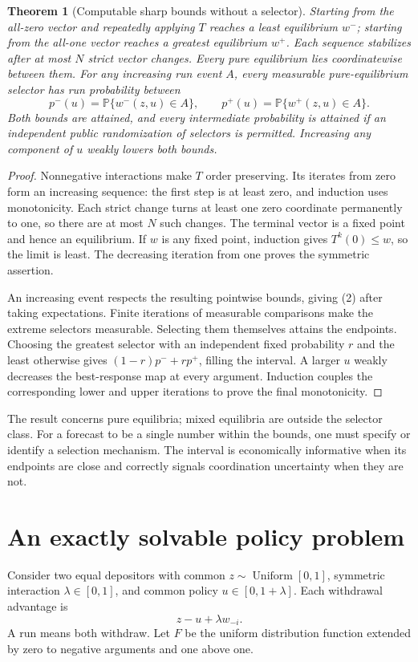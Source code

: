 \documentclass[11pt,a4paper]{article}
\newtheorem{theorem}{Theorem}[section]
\theoremstyle{remark}
\newcommand{\Prob}{\mathbb P}
\begin{document}
\begin{theorem}[Computable sharp bounds without a selector]
Starting from the all-zero vector and repeatedly applying $T$ reaches a least equilibrium $w^-$; starting from the all-one vector reaches a greatest equilibrium $w^+$. Each sequence stabilizes after at most $N$ strict vector changes. Every pure equilibrium lies coordinatewise between them. For any increasing run event $A$, every measurable pure-equilibrium selector has run probability between
\[
 p^-(u)=\Prob\{w^-(z,u)\in A\},\qquad
 p^+(u)=\Prob\{w^+(z,u)\in A\}. \tag{2}
\]
Both bounds are attained, and every intermediate probability is attained if an independent public randomization of selectors is permitted. Increasing any component of $u$ weakly lowers both bounds.
\end{theorem}
\begin{proof}
Nonnegative interactions make $T$ order preserving. Its iterates from zero form an increasing sequence: the first step is at least zero, and induction uses monotonicity. Each strict change turns at least one zero coordinate permanently to one, so there are at most $N$ such changes. The terminal vector is a fixed point and hence an equilibrium. If $w$ is any fixed point, induction gives $T^k(0)\le w$, so the limit is least. The decreasing iteration from one proves the symmetric assertion.

An increasing event respects the resulting pointwise bounds, giving (2) after taking expectations. Finite iterations of measurable comparisons make the extreme selectors measurable. Selecting them themselves attains the endpoints. Choosing the greatest selector with an independent fixed probability $r$ and the least otherwise gives $(1-r)p^-+rp^+$, filling the interval. A larger $u$ weakly decreases the best-response map at every argument. Induction couples the corresponding lower and upper iterations to prove the final monotonicity.
\end{proof}
The result concerns pure equilibria; mixed equilibria are outside the selector class. For a forecast to be a single number within the bounds, one must specify or identify a selection mechanism. The interval is economically informative when its endpoints are close and correctly signals coordination uncertainty when they are not.

\section{An exactly solvable policy problem}
Consider two equal depositors with common $z\sim\operatorname{Uniform}[0,1]$, symmetric interaction $\lambda\in[0,1]$, and common policy $u\in[0,1+\lambda]$. Each withdrawal advantage is
\[
 z-u+\lambda w_{-i}.
\]
A run means both withdraw. Let $F$ be the uniform distribution function extended by zero to negative arguments and one above one.
\end{document}
